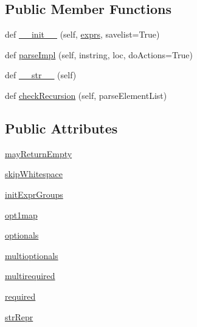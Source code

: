 \subsection*{Public Member Functions}
\begin{DoxyCompactItemize}
\item 
def \hyperlink{classsetuptools_1_1__vendor_1_1pyparsing_1_1Each_af875a9988c483efdc95ddf58f94b9052}{\+\_\+\+\_\+init\+\_\+\+\_\+} (self, \hyperlink{classsetuptools_1_1__vendor_1_1pyparsing_1_1ParseExpression_a4e2611e5f2c7118fb18cdc4a710bd3db}{exprs}, savelist=True)
\item 
def \hyperlink{classsetuptools_1_1__vendor_1_1pyparsing_1_1Each_afa07aacae6a3650b417e164970b9fdc8}{parse\+Impl} (self, instring, loc, do\+Actions=True)
\item 
def \hyperlink{classsetuptools_1_1__vendor_1_1pyparsing_1_1Each_a25fd9d64f5e07394f7612cf7c5a3bb72}{\+\_\+\+\_\+str\+\_\+\+\_\+} (self)
\item 
def \hyperlink{classsetuptools_1_1__vendor_1_1pyparsing_1_1Each_aaf13836b8856390839ae5025f3424af6}{check\+Recursion} (self, parse\+Element\+List)
\end{DoxyCompactItemize}
\subsection*{Public Attributes}
\begin{DoxyCompactItemize}
\item 
\hyperlink{classsetuptools_1_1__vendor_1_1pyparsing_1_1Each_abc94cbbc62007fd8f33b7b75b8aa016b}{may\+Return\+Empty}
\item 
\hyperlink{classsetuptools_1_1__vendor_1_1pyparsing_1_1Each_a3431187314686b1a0b427122fbb647d6}{skip\+Whitespace}
\item 
\hyperlink{classsetuptools_1_1__vendor_1_1pyparsing_1_1Each_a851df40f2494ec187c9f0ea62c672b64}{init\+Expr\+Groups}
\item 
\hyperlink{classsetuptools_1_1__vendor_1_1pyparsing_1_1Each_aa96fadc9b3e2202b198786827a519b9b}{opt1map}
\item 
\hyperlink{classsetuptools_1_1__vendor_1_1pyparsing_1_1Each_a6663039dcddfd2b28ab12cc292df467b}{optionals}
\item 
\hyperlink{classsetuptools_1_1__vendor_1_1pyparsing_1_1Each_a89382ae9db677a919915b8f85cd59d0f}{multioptionals}
\item 
\hyperlink{classsetuptools_1_1__vendor_1_1pyparsing_1_1Each_a6842eea88d9654335bd509e102875b58}{multirequired}
\item 
\hyperlink{classsetuptools_1_1__vendor_1_1pyparsing_1_1Each_a680d0faf189fd494232f208b1be49efd}{required}
\item 
\hyperlink{classsetuptools_1_1__vendor_1_1pyparsing_1_1Each_a2ac54833799391ce7a2c9121738ec935}{str\+Repr}
\end{DoxyCompactItemize}
